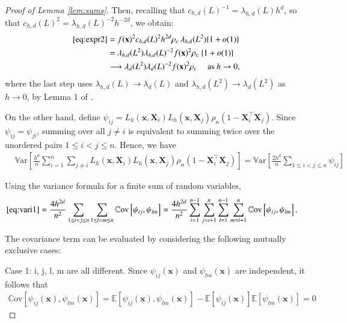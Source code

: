 \documentclass[12pt]{report} %
\newcommand{\bX}{\mathbf{X}}
\newcommand{\bx}{\mathbf{x}}
\newcommand{\lc}{\left[}
\newcommand{\rc}{\right]}
\newcommand{\V}[1]{\mathbb{V}\mathrm{ar}\lc #1\rc}
\newcommand{\Cov}[2]{\mathbb{C}\mathrm{ov}\lc #1,#2\rc}
\begin{document}
\begin{proof}[Proof of Lemma \ref{lem:sums}]
Then, recalling that $c_{h,d}(L)^{-1} = \lambda_{h,d}(L) h^d$, so that $c_{h,d}(L)^2 = \lambda_{h,d}(L)^{-2} h^{-2d}$, we obtain:
\begin{align}
\eqref{eq:expr2} 
&= f(\bx)^2 c_{h,d}(L)^2 h^{2d}  \rho_c\, \lambda_{h,d}(L^2) 
\{1+o(1)\} \nonumber \\
&= \lambda_{h,d}(L^2) \lambda_{h,d}(L)^{-2} f(\bx)^2  \rho_{\mathrm{c}}\
\{1+o(1)\} \nonumber \\
&\longrightarrow \lambda_d(L^2) \lambda_d(L)^{-2} f(\bx)^2  \rho_{\mathrm{c}}\ 
\quad \text{as } h \to 0,
\end{align}
where the last step uses $\lambda_{h,d}(L) \to \lambda_d(L)$ and 
$\lambda_{h,d}(L^2) \to \lambda_d(L^2)$ as $h \to 0$, by Lemma 1 of \citep{Garcia-Portugues2013b}. 

On the other hand, define $\psi_{ij} = L_h\left(\bx, \bX_i\right)L_h\left(\bx, \bX_j\right)  \rho_n\left(1-\bX_i^\top\bX_j\right)$. Since $\psi_{ij}=\psi_{ji}$, summing over all $j\neq i$ is equivalent to summing twice over the unordered pairs $1\leq i<j\leq n$. Hence, we have
\begin{align}
&\V{\frac{h^d}{n} \sum_{i=1}^n\sum_{j\neq i} L_h\left(\bx, \bX_i\right)L_h\left(\bx, \bX_j\right)  \rho_n\left(1-\bX_i^\top\bX_j\right)} = \V{\frac{2h^d}{n} \sum_{1 \leq i<j\leq n} \psi_{ij}}  \label{eq:vari1}
\end{align}

Using the variance formula for a finite sum of random variables,
\begin{align}
\eqref{eq:vari1} &= \frac{4h^{2d}}{n^2} \sum_{1\leq i<j\leq n} \sum_{1\leq l<m\leq n} \Cov{\psi_{ij}}{\psi_{lm}} \nonumber 
=\frac{4h^{2d}}{n^2} \sum_{i=1}^{n-1} \sum_{j=i+1}^{n} \sum_{l=1}^{n-1} \sum_{m=l+1}^{n} \Cov{\psi_{ij}}{\psi_{lm}}.
\end{align}

The covariance term can be evaluated by considering the following mutually exclusive cases:

Case 1: i, j, l, m are all different. Since $\psi_{ij}(\bx)$ and $\psi_{lm}(\bx)$ are independent, it follows that
\begin{align*}
\Cov{\psi_{ij}(\bx)}{\psi_{lm}(\bx)} = \mathbb{E}[\psi_{ij}(\bx), \psi_{lm}(\bx)] - \mathbb{E}[\psi_{ij}(\bx)]\mathbb{E}[\psi_{lm}(\bx)] = 0
\end{align*}


\end{proof}
\end{document}
